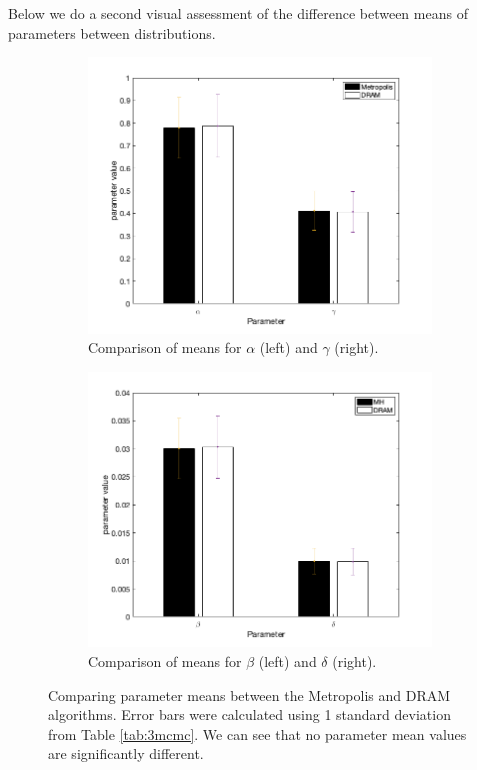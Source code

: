 \par Below we do a second visual assessment of the difference between means of parameters between distributions.
\begin{figure}[H]
\begin{subfigure}{.5\textwidth}
  \centering
  \includegraphics[width=1\linewidth]{MCMC_figs/met_lv_final/mh_dram_paramComp1.png}
  \caption{Comparison of means for $\alpha$ (left) and $\gamma$ (right).}
  \label{fig:12amcmcm}
\end{subfigure}
\begin{subfigure}{.5\textwidth}
  \centering
  \includegraphics[width=1\linewidth]{MCMC_figs/met_lv_final/mh_dram_paramComp2.png}
  \caption{Comparison of means for $\beta$ (left) and $\delta$ (right).}
  \label{fig:12bmcmcm} 
\end{subfigure}
\caption{Comparing parameter means between the Metropolis and DRAM algorithms. Error bars were calculated using 1 standard deviation from Table \ref{tab:3mcmc}. We can see that no parameter mean values are significantly different.}
\label{fig:12mcmc}
\end{figure}
